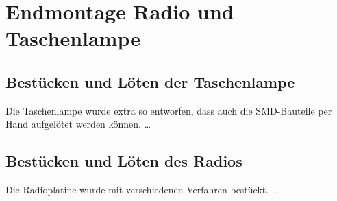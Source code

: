 
\section{Endmontage Radio und Taschenlampe}

\subsection{Bestücken und Löten der Taschenlampe}
Die Taschenlampe wurde extra so entworfen, dass auch die SMD-Bauteile per Hand aufgelötet werden können. \ldots

\subsection{Bestücken und Löten des Radios}
Die Radioplatine wurde mit verschiedenen Verfahren bestückt. \ldots
